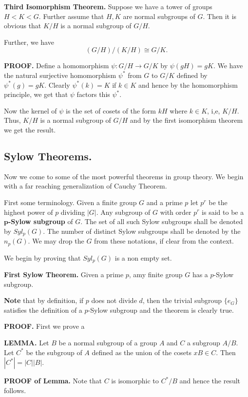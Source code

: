 \documentclass[12pt]{article}
\begin{document}
{\bf Third Isomorphism Theorem.}
Suppose we have a tower of groups $H< K< G$. Further assume
that $H,K$ are normal subgroups of $G$. Then it is obvious that $K/H$
is a normal subgroup of $G/H$.

Further, we have
$$(G/H)/(K/H) \cong G/K.$$

{\bf PROOF.} Define a homomorphism $\psi: G/H \rightarrow G/K$ by
$\psi(gH)=gK$.
We have the natural surjective homomorphism $\psi^*$ from $G$ to $G/K$
defined by $\psi^*(g)=gK$. Clearly $\psi^*(k)=K$ if $k\in K$ and hence by
the homomorphism principle, we get that $\psi$ factors this $\psi^*$.

Now the kernel of $\psi$ is the set of cosets of the form $kH$ where
$k\in K$, i,e, $K/H$. Thus, $K/H$ is a normal subgroup of $G/H$ and by
the first isomorphism theorem we get the result.

\subsection{Sylow Theorems.}
Now we come to some of the most powerful theorems in group theory.
We begin with a far reaching generalization of Cauchy Theorem.

First some terminology. Given a finite group $G$ and a
prime $p$ let $p^r$ be the highest power of $p$ dividing $|G|$. Any
subgroup of $G$ with order $p^r$ is said to be a
{\bf $\mathbf{p}$-Sylow subgroup } of $G$.
The set of all such Sylow subgroups shall be denoted by $Syl_p(G)$. 
The number of distinct Sylow subgroups shall be denoted by the $n_p(G)$.
We may drop the $G$ from these notations, if clear from the context.

We begin by proving that $Syl_p(G)$ is a non empty set.

{\bf First Sylow Theorem.} Given a prime $p$, amy finite group $G$
has a $p$-Sylow subgroup.

{\bf Note} that by definition, if $p$ does not divide $d$, then the
trivial subgroup $\{e_G\}$ satisfies the definition of a $p$-Sylow
subgroup and the theorem is clearly true.

{\bf PROOF.}
First we prove a

{\bf LEMMA.}
Let $B$ be a normal subgroup of a group $A$ and $C$ a subgroup $A/B$.
Let $C^*$ be the subgroup of $A$ defined as the union of the cosets
$xB\in C$. Then $|C^*|=|C||B|$.

{\bf PROOF of Lemma.}
Note that $C$ is isomorphic to $C^*/B$ and hence the result follows.
\end{document}
